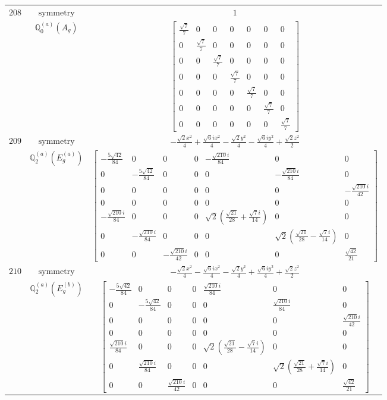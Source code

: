 \documentclass[fleqn,8pt,landscape]{jsarticle}
\begin{document}
\begin{longtable}{ccc}
$ 208 $ & $ \text{symmetry} $ & $ 1 $ \\
$  $ & $ \mathbb{Q}_{0}^{(a)}(A_{g}) $ & $ \begin{bmatrix} \frac{\sqrt{7}}{7} & 0 & 0 & 0 & 0 & 0 & 0 \\ 0 & \frac{\sqrt{7}}{7} & 0 & 0 & 0 & 0 & 0 \\ 0 & 0 & \frac{\sqrt{7}}{7} & 0 & 0 & 0 & 0 \\ 0 & 0 & 0 & \frac{\sqrt{7}}{7} & 0 & 0 & 0 \\ 0 & 0 & 0 & 0 & \frac{\sqrt{7}}{7} & 0 & 0 \\ 0 & 0 & 0 & 0 & 0 & \frac{\sqrt{7}}{7} & 0 \\ 0 & 0 & 0 & 0 & 0 & 0 & \frac{\sqrt{7}}{7} \end{bmatrix} $ \\ \hline
$ 209 $ & $ \text{symmetry} $ & $ - \frac{\sqrt{2} x^{2}}{4} + \frac{\sqrt{6} i x^{2}}{4} - \frac{\sqrt{2} y^{2}}{4} - \frac{\sqrt{6} i y^{2}}{4} + \frac{\sqrt{2} z^{2}}{2} $ \\
$  $ & $ \mathbb{Q}_{2}^{(a)}(E_{g}^{(a)}) $ & $ \begin{bmatrix} - \frac{5 \sqrt{42}}{84} & 0 & 0 & 0 & - \frac{\sqrt{210} i}{84} & 0 & 0 \\ 0 & - \frac{5 \sqrt{42}}{84} & 0 & 0 & 0 & - \frac{\sqrt{210} i}{84} & 0 \\ 0 & 0 & 0 & 0 & 0 & 0 & - \frac{\sqrt{210} i}{42} \\ 0 & 0 & 0 & 0 & 0 & 0 & 0 \\ - \frac{\sqrt{210} i}{84} & 0 & 0 & 0 & \sqrt{2} \left(\frac{\sqrt{21}}{28} + \frac{\sqrt{7} i}{14}\right) & 0 & 0 \\ 0 & - \frac{\sqrt{210} i}{84} & 0 & 0 & 0 & \sqrt{2} \left(\frac{\sqrt{21}}{28} - \frac{\sqrt{7} i}{14}\right) & 0 \\ 0 & 0 & - \frac{\sqrt{210} i}{42} & 0 & 0 & 0 & \frac{\sqrt{42}}{21} \end{bmatrix} $ \\ \hline
$ 210 $ & $ \text{symmetry} $ & $ - \frac{\sqrt{2} x^{2}}{4} - \frac{\sqrt{6} i x^{2}}{4} - \frac{\sqrt{2} y^{2}}{4} + \frac{\sqrt{6} i y^{2}}{4} + \frac{\sqrt{2} z^{2}}{2} $ \\
$  $ & $ \mathbb{Q}_{2}^{(a)}(E_{g}^{(b)}) $ & $ \begin{bmatrix} - \frac{5 \sqrt{42}}{84} & 0 & 0 & 0 & \frac{\sqrt{210} i}{84} & 0 & 0 \\ 0 & - \frac{5 \sqrt{42}}{84} & 0 & 0 & 0 & \frac{\sqrt{210} i}{84} & 0 \\ 0 & 0 & 0 & 0 & 0 & 0 & \frac{\sqrt{210} i}{42} \\ 0 & 0 & 0 & 0 & 0 & 0 & 0 \\ \frac{\sqrt{210} i}{84} & 0 & 0 & 0 & \sqrt{2} \left(\frac{\sqrt{21}}{28} - \frac{\sqrt{7} i}{14}\right) & 0 & 0 \\ 0 & \frac{\sqrt{210} i}{84} & 0 & 0 & 0 & \sqrt{2} \left(\frac{\sqrt{21}}{28} + \frac{\sqrt{7} i}{14}\right) & 0 \\ 0 & 0 & \frac{\sqrt{210} i}{42} & 0 & 0 & 0 & \frac{\sqrt{42}}{21} \end{bmatrix} $ \\ \hline

\end{longtable}
\end{document}
